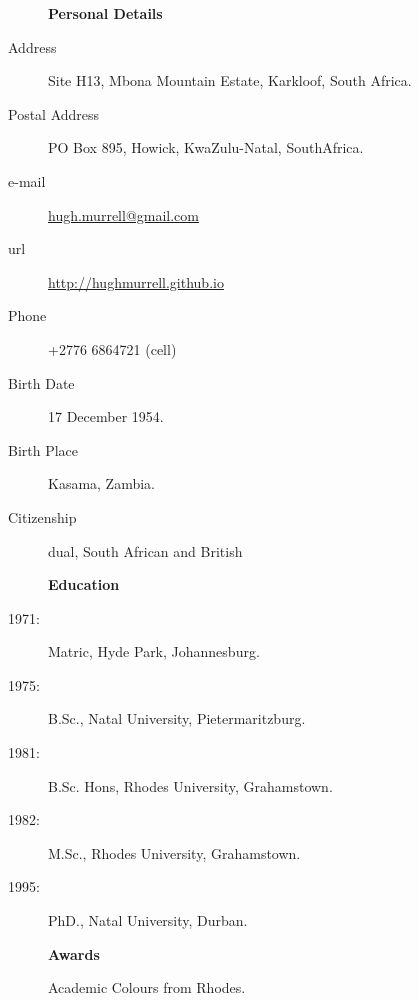 \documentclass[12pt]{article}
\begin{document}
\begin{multicols}{2}
\begin{description}\item[] \begin{description}\item[] {\large \bf   Personal Details  }
\item[Address]  Site H13, Mbona Mountain Estate, Karkloof, South Africa.
\item[Postal Address] PO Box 895, Howick, KwaZulu-Natal, SouthAfrica.
\item[e-mail]  \url{hugh.murrell@gmail.com}
\item[url]  \url{http://hughmurrell.github.io}
\item[Phone]  +2776 6864721 (cell) 
\item[Birth Date]  17 December 1954.
\item[Birth Place]  Kasama, Zambia.
\item[Citizenship]  dual, South African and British
\end{description}
\end{description}

\begin{description}\item[] \begin{description}\item[] {\large \bf   Education  }    
\item[1971:] Matric, Hyde Park, Johannesburg.
  \item[1975:]  B.Sc., Natal University, Pietermaritzburg. 
  \item[1981:]  B.Sc. Hons, Rhodes University, Grahamstown. 
  \item[1982: ] M.Sc., Rhodes University, Grahamstown. 
  \item[1995: ] PhD., Natal University, Durban. 
 \end{description}
 \end{description}
 
 \begin{description}\item[] \begin{description}\item[] {\large \bf   Awards  } 
  \item[ ]Academic Colours from Rhodes.  
  \vspace{1cm}
\end{description}
\end{description}



\end{multicols}
\end{document}
